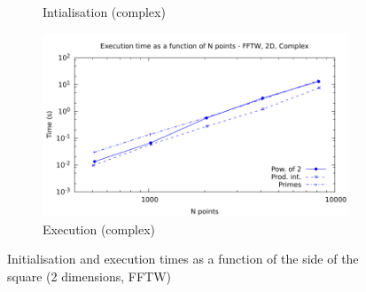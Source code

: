 \documentclass[12pt, a4paper]{article}
\begin{document}
\begin{figure}[H]
\begin{subfigure}{.5\textwidth}
\caption{Intialisation (complex)}
\label{2DFFTWCI}
\end{subfigure}%
\begin{subfigure}{.5\textwidth}
\centering
\includegraphics[width=.9\linewidth]{graphs/2d-fftw-exec-c.pdf}
\caption{Execution (complex)}
\label{2DFFTWC}
\end{subfigure}
\caption{Initialisation and execution times as a function of the side of the square (2 dimensions, FFTW)}
\label{2DFFTW}
\end{figure}
\end{document}
